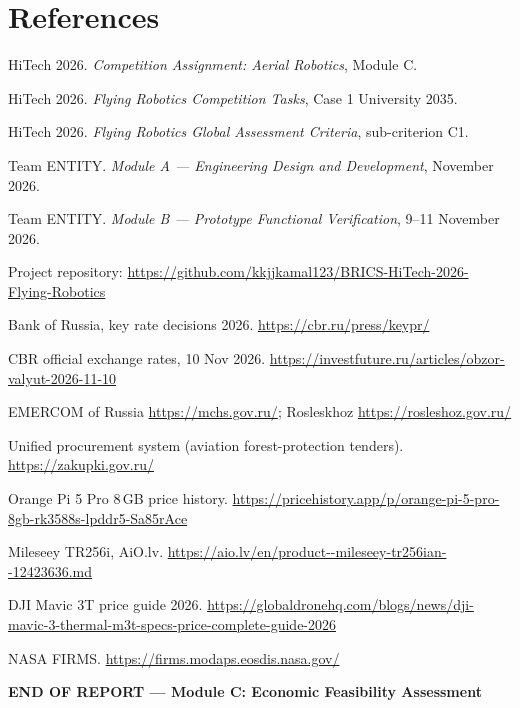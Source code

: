 \documentclass[10pt,a4paper]{article}
\begin{document}
\section*{References}
\begin{enumerate}[label={[\arabic*]},leftmargin=2.2em,itemsep=0pt]\small
\item HiTech 2026. \textit{Competition Assignment: Aerial Robotics}, Module C.
\item HiTech 2026. \textit{Flying Robotics Competition Tasks}, Case 1 University 2035.
\item HiTech 2026. \textit{Flying Robotics Global Assessment Criteria}, sub-criterion C1.
\item Team ENTITY. \textit{Module A --- Engineering Design and Development}, November 2026.
\item Team ENTITY. \textit{Module B --- Prototype Functional Verification}, 9--11 November 2026.
\item Project repository: \url{https://github.com/kkjjkamal123/BRICS-HiTech-2026-Flying-Robotics}
\item Bank of Russia, key rate decisions 2026. \url{https://cbr.ru/press/keypr/}
\item CBR official exchange rates, 10 Nov 2026. \url{https://investfuture.ru/articles/obzor-valyut-2026-11-10}
\item EMERCOM of Russia \url{https://mchs.gov.ru/}; Rosleskhoz \url{https://rosleshoz.gov.ru/}
\item Unified procurement system (aviation forest-protection tenders). \url{https://zakupki.gov.ru/}
\item Orange Pi 5 Pro 8\,GB price history. \url{https://pricehistory.app/p/orange-pi-5-pro-8gb-rk3588s-lpddr5-Sa85rAce}
\item Mileseey TR256i, AiO.lv. \url{https://aio.lv/en/product--mileseey-tr256ian--12423636.md}
\item DJI Mavic 3T price guide 2026. \url{https://globaldronehq.com/blogs/news/dji-mavic-3-thermal-m3t-specs-price-complete-guide-2026}
\item NASA FIRMS. \url{https://firms.modaps.eosdis.nasa.gov/}
\end{enumerate}

\vspace{6pt}
\begin{center}
\textbf{END OF REPORT --- Module C: Economic Feasibility Assessment}
\end{center}
\end{document}
